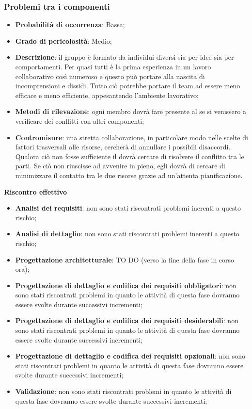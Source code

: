 		\subsubsection{Problemi tra i componenti} %
		\label{ssub:problemi_tra_i_componenti}
			\begin{itemize}
				\item \textbf{Probabilità di occorrenza}: Bassa;
				\item \textbf{Grado di pericolosità}: Medio;
				\item \textbf{Descrizione}: il gruppo è formato da individui diversi sia per idee sia per comportamenti. Per quasi tutti è la prima esperienza in un lavoro collaborativo così numeroso e questo può portare alla nascita di incomprensioni e dissidi. Tutto ciò potrebbe portare il team ad essere meno efficace e meno efficiente, appesantendo l'ambiente lavorativo;
				\item \textbf{Metodi di rilevazione}: ogni membro dovrà fare presente al \roleProjectManager{} se si venissero a verificare dei conflitti con altri componenti;
				\item \textbf{Contromisure}: una stretta collaborazione, in particolare modo nelle scelte di fattori trasversali alle risorse, cercherà di annullare i possibili disaccordi. \newline
				Qualora ciò non fosse sufficiente il \roleProjectManager{} dovrà cercare di risolvere il conflitto tra le parti. Se ciò non riuscisse ad avvenire in pieno, egli dovrà di cercare di minimizzare il contatto tra le due risorse grazie ad un'attenta pianificazione. \newline
			\end{itemize}
		\noindent
		\textbf{Riscontro effettivo}
			\begin{itemize}
				\item \textbf{Analisi dei requisiti}: non sono stati riscontrati problemi inerenti a questo rischio;
				\item \textbf{Analisi di dettaglio}: non sono stati riscontrati problemi inerenti a questo rischio;
				\item \textbf{Progettazione architetturale}: TO DO (verso la fine della fase in corso ora);
				\item \textbf{Progettazione di dettaglio e codifica dei requisiti obbligatori}: non sono stati riscontrati problemi in quanto le attività di questa fase dovranno essere svolte durante successivi incrementi;
				\item \textbf{Progettazione di dettaglio e codifica dei requisiti desiderabili}: non sono stati riscontrati problemi in quanto le attività di questa fase dovranno essere svolte durante successivi incrementi;
				\item \textbf{Progettazione di dettaglio e codifica dei requisiti opzionali}: non sono stati riscontrati problemi in quanto le attività di questa fase dovranno essere svolte durante successivi incrementi;
				\item \textbf{Validazione}: non sono stati riscontrati problemi in quanto le attività di questa fase dovranno essere svolte durante successivi incrementi;
			\end{itemize}

